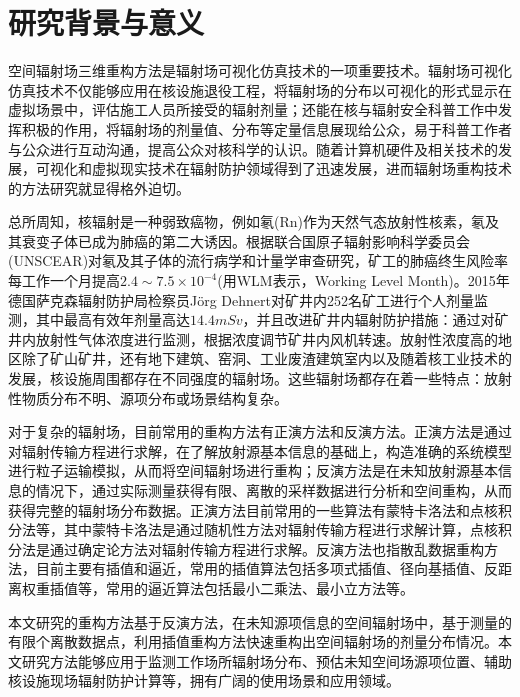 \section{研究背景与意义}
空间辐射场三维重构方法是辐射场可视化仿真技术的一项重要技术。辐射场可视化仿真技术不仅能够应用在核设施退役工程，将辐射场的分布以可视化的形式显示在虚拟场景中，评估施工人员所接受的辐射剂量\textsuperscript{\cite{wang2020reconstruction}}；还能在核与辐射安全科普工作中发挥积极的作用，将辐射场的剂量值、分布等定量信息展现给公众，易于科普工作者与公众进行互动沟通，提高公众对核科学的认识\textsuperscript{\cite{曹亚丽2014科学传播模式在我国核与辐射安全科普工作中的应用}}。随着计算机硬件及相关技术的发展，可视化和虚拟现实技术在辐射防护领域得到了迅速发展\textsuperscript{\cite{chen2021visualization}}，进而辐射场重构技术的方法研究就显得格外迫切。

总所周知，核辐射是一种弱致癌物，例如氡(Rn)作为天然气态放射性核素，氡及其衰变子体已成为肺癌的第二大诱因\textsuperscript{\cite{Böhm2020Radon}}。根据联合国原子辐射影响科学委员会(UNSCEAR)对氡及其子体的流行病学和计量学审查研究，矿工的肺癌终生风险率每工作一个月提高$ 2.4 \sim 7.5 \times 10^{-4} $(用WLM表示，Working Level Month)\textsuperscript{\cite{John2021Lung}}。2015年德国萨克森辐射防护局检察员Jörg Dehnert对矿井内252名矿工进行个人剂量监测，其中最高有效年剂量高达$ 14.4 mSv $，并且改进矿井内辐射防护措施：通过对矿井内放射性气体浓度进行监测，根据浓度调节矿井内风机转速\textsuperscript{\cite{dehnert2020radon}}。放射性浓度高的地区除了矿山矿井，还有地下建筑、窑洞、工业废渣建筑室内以及随着核工业技术的发展，核设施周围都存在不同强度的辐射场。这些辐射场都存在着一些特点：放射性物质分布不明、源项分布或场景结构复杂。

对于复杂的辐射场，目前常用的重构方法有正演方法和反演方法。正演方法是通过对辐射传输方程进行求解，在了解放射源基本信息的基础上，构造准确的系统模型进行粒子运输模拟，从而将空间辐射场进行重构；反演方法是在未知放射源基本信息的情况下，通过实际测量获得有限、离散的采样数据进行分析和空间重构，从而获得完整的辐射场分布数据。正演方法目前常用的一些算法有蒙特卡洛法\textsuperscript{\cite{MAJER2019108824}}和点核积分法\textsuperscript{\cite{ZHANG2021108179}}等，其中蒙特卡洛法是通过随机性方法对辐射传输方程进行求解计算，点核积分法是通过确定论方法对辐射传输方程进行求解。反演方法也指散乱数据重构方法，目前主要有插值\textsuperscript{\cite{WANG201827}}和逼近，常用的插值算法包括多项式插值、径向基插值、反距离权重插值等，常用的逼近算法包括最小二乘法、最小立方法等。

本文研究的重构方法基于反演方法，在未知源项信息的空间辐射场中，基于测量的有限个离散数据点，利用插值重构方法快速重构出空间辐射场的剂量分布情况。本文研究方法能够应用于监测工作场所辐射场分布、预估未知空间场源项位置、辅助核设施现场辐射防护计算等，拥有广阔的使用场景和应用领域。